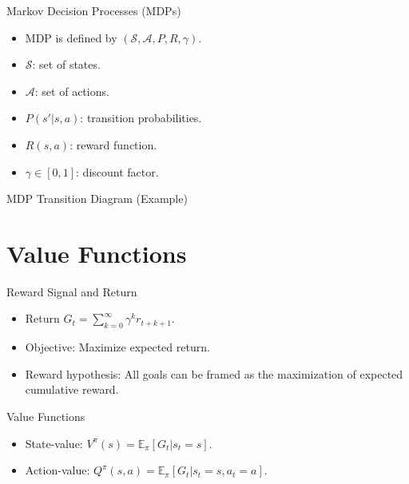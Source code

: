 \documentclass{beamer}
\begin{document}
\begin{frame}{Markov Decision Processes (MDPs)}
 \begin{itemize}
   \item MDP is defined by $(\mathcal{S}, \mathcal{A}, P, R, \gamma)$.
   \item $\mathcal{S}$: set of states.
   \item $\mathcal{A}$: set of actions.
   \item $P(s'|s,a)$: transition probabilities.
   \item $R(s,a)$: reward function.
   \item $\gamma \in [0,1]$: discount factor.
 \end{itemize}
\end{frame}

\begin{frame}{MDP Transition Diagram (Example)}
 \centering
\end{frame}

\section{Value Functions}
\begin{frame}{Reward Signal and Return}
 \begin{itemize}
   \item Return $G_t = \sum_{k=0}^{\infty} \gamma^k r_{t+k+1}$.
   \item Objective: Maximize expected return.
   \item Reward hypothesis: All goals can be framed as the maximization of expected cumulative reward.
 \end{itemize}
\end{frame}

\begin{frame}{Value Functions}
 \begin{itemize}
   \item State-value: $V^\pi(s) = \mathbb{E}_\pi[G_t | s_t = s]$.
   \item Action-value: $Q^\pi(s,a) = \mathbb{E}_\pi[G_t | s_t = s, a_t = a]$.
 \end{itemize}
\end{frame}
\end{document}
